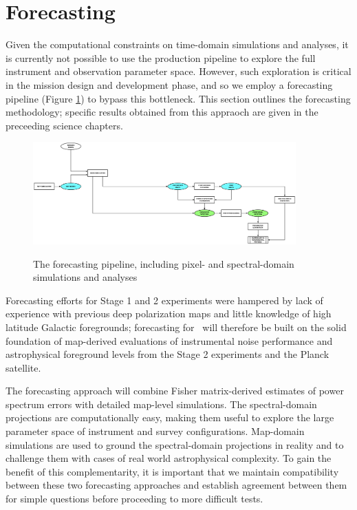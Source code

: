 
\section{Forecasting}\label{sec:Forecasting}

Given the computational constraints on time-domain simulations and analyses, it is currently not possible to use the production pipeline to explore the full instrument and observation parameter space. However, such exploration is critical in the mission design and development phase, and so we employ a forecasting pipeline (Figure \ref{fig_fcast}) to bypass this bottleneck. This section outlines the forecasting methodology; specific results obtained from this appraoch are given in the preceeding science chapters.

\begin{figure}[htbp]
\includegraphics[width=0.9\textwidth]{Analysis/forecast}\\
\caption{The forecasting pipeline, including pixel- and spectral-domain simulations and analyses}
\label{fig_fcast}
\end{figure}

Forecasting efforts for Stage 1 and 2 experiments were hampered by lack of experience with previous deep polarization maps and little knowledge of high latitude Galactic foregrounds; forecasting for \cmbexp\ will therefore be built on the solid foundation of map-derived evaluations of instrumental noise performance and astrophysical foreground levels from the Stage 2 experiments and the Planck satellite.

The forecasting approach will combine Fisher matrix-derived estimates of power spectrum errors with detailed map-level simulations.
The spectral-domain projections are computationally easy, making them useful to explore the large parameter space of instrument and survey configurations.
Map-domain simulations are used to ground the spectral-domain projections in reality and to challenge them with cases of real world astrophysical complexity.
To gain the benefit of this complementarity, it is important that we maintain compatibility between these two forecasting approaches and establish agreement between them for simple questions before proceeding to more difficult tests.

